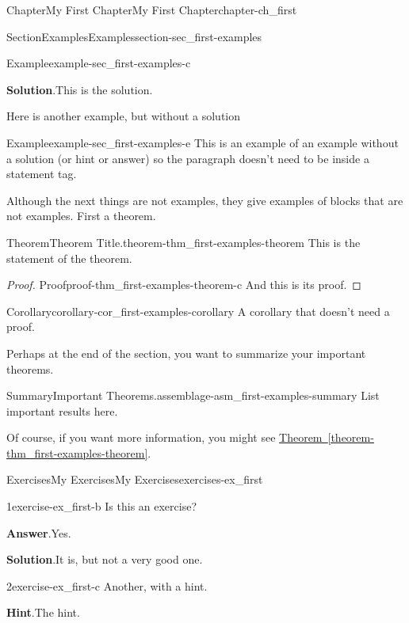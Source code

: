 \documentclass[oneside,10pt,]{book}
\newcommand{\blocktitlefont}{\relax}
\newcommand{\xreffont}{\relax}
\begin{document}
\begin{chapterptx}{Chapter}{My First Chapter}{}{My First Chapter}{}{}{chapter-ch_first}
\begin{sectionptx}{Section}{Examples}{}{Examples}{}{}{section-sec_first-examples}
\begin{example}{Example}{}{example-sec_first-examples-c}
\par\smallskip%
\noindent\textbf{\blocktitlefont Solution}.\hypertarget{solution-sec_first-examples-c-b}{}\quad{}This is the solution.%
\end{example}
Here is another example, but without a solution%
\begin{example}{Example}{}{example-sec_first-examples-e}%
This is an example of an example without a solution (or hint or answer) so the paragraph doesn't need to be inside a statement tag.%
\end{example}
Although the next things are not examples, they give examples of blocks that are not examples.  First a theorem.%
\begin{theorem}{Theorem}{Theorem Title.}{}{theorem-thm_first-examples-theorem}%
This is the statement of the theorem.%
\end{theorem}
\begin{proof}{Proof}{}{proof-thm_first-examples-theorem-c}
And this is its proof.%
\end{proof}
\begin{corollary}{Corollary}{}{}{corollary-cor_first-examples-corollary}%
A corollary that doesn't need a proof.%
\end{corollary}
Perhaps at the end of the section, you want to summarize your important theorems.%
\begin{assemblage}{Summary}{Important Theorems.}{assemblage-asm_first-examples-summary}%
List important results here.%
\end{assemblage}
Of course, if you want more information, you might see \hyperref[theorem-thm_first-examples-theorem]{Theorem~{\xreffont\ref{theorem-thm_first-examples-theorem}}}.%
\end{sectionptx}
%
%
\typeout{************************************************}
\typeout{************************************************}
%
\begin{exercises-section}{Exercises}{My Exercises}{}{My Exercises}{}{}{exercises-ex_first}
\begin{divisionexercise}{1}{}{}{exercise-ex_first-b}%
Is this an exercise?%
\par\smallskip%
\noindent\textbf{\blocktitlefont Answer}.\hypertarget{answer-ex_first-b-b}{}\quad{}Yes.%
\par\smallskip%
\noindent\textbf{\blocktitlefont Solution}.\hypertarget{solution-ex_first-b-c}{}\quad{}It is, but not a very good one.%
\end{divisionexercise}%
\begin{divisionexercise}{2}{}{}{exercise-ex_first-c}%
Another, with a hint.%
\par\smallskip%
\noindent\textbf{\blocktitlefont Hint}.\hypertarget{hint-ex_first-c-b}{}\quad{}The hint.%
\end{divisionexercise}%
\end{exercises-section}
\end{chapterptx}
\end{document}
